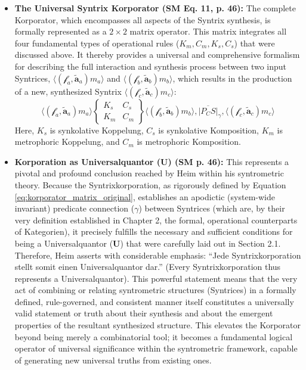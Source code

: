 \documentclass[12pt]{article}
\newcommand{\q}[1]{\enquote{#1}}
\newcommand{\metrophor}{\bm{\widetilde{a}}}
\newcommand{\synkolator}{\mathcal{f}}
\newcommand{\synkolationsstufe}{m}
\newcommand{\universalquantor}{\bm{U}}
\newcommand{\aspektivsystem}{P}
\newcommand{\subjektiveraspekt}{S}
\newcommand{\korporatoroperator}{\begin{Bmatrix} K_s & C_s \\ K_m & C_m \end{Bmatrix}}
\begin{document}
\begin{itemize}
    \item \textbf{The Universal Syntrix Korporator (SM Eq. 11, p. 46):}
    The complete Korporator, which encompasses all aspects of the Syntrix synthesis, is formally represented as a \( 2 \times 2 \) matrix operator. This matrix integrates all four fundamental types of operational rules (\( K_m, C_m, K_s, C_s \)) that were discussed above. It thereby provides a universal and comprehensive formalism for describing the full interaction and synthesis process between two input Syntrices, \( \langle(\synkolator_a,\metrophor_a)\synkolationsstufe_a\rangle \) and \( \langle(\synkolator_b,\metrophor_b)\synkolationsstufe_b\rangle \), which results in the production of a new, synthesized Syntrix \( \langle(\synkolator_c,\metrophor_c)\synkolationsstufe_c\rangle \):
    \begin{equation}
    \langle (\synkolator_a, \metrophor_a) \synkolationsstufe_a \rangle \korporatoroperator \langle (\synkolator_b, \metrophor_b) \synkolationsstufe_b \rangle, \overline{|\aspektivsystem_C \subjektiveraspekt|}_\gamma, \langle (\synkolator_c, \metrophor_c) \synkolationsstufe_c \rangle
    \label{eq:korporator_matrix_original}
    \end{equation}
    Here, \(K_s\) is synkolative Koppelung, \(C_s\) is synkolative Komposition, \(K_m\) is metrophoric Koppelung, and \(C_m\) is metrophoric Komposition.

    \item \textbf{Korporation as Universalquantor (\(\universalquantor\)) (SM p. 46):}
    This represents a pivotal and profound conclusion reached by Heim within his syntrometric theory. Because the Syntrixkorporation, as rigorously defined by Equation \eqref{eq:korporator_matrix_original}, establishes an apodictic (system-wide invariant) predicate connection (\( \gamma \)) between Syntrices (which are, by their very definition established in Chapter 2, the formal, operational counterparts of Kategorien), it precisely fulfills the necessary and sufficient conditions for being a Universalquantor (\(\universalquantor\)) that were carefully laid out in Section 2.1. Therefore, Heim asserts with considerable emphasis: \q{Jede Syntrixkorporation stellt somit einen Universalquantor dar.} (Every Syntrixkorporation thus represents a Universalquantor). This powerful statement means that the very act of combining or relating syntrometric structures (Syntrices) in a formally defined, rule-governed, and consistent manner itself constitutes a universally valid statement or truth about their synthesis and about the emergent properties of the resultant synthesized structure. This elevates the Korporator beyond being merely a combinatorial tool; it becomes a fundamental logical operator of universal significance within the syntrometric framework, capable of generating new universal truths from existing ones.
\end{itemize}
\end{document}
